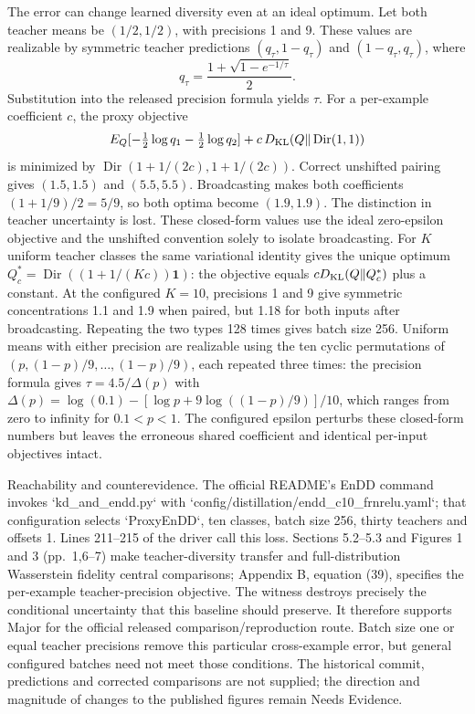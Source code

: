 \documentclass[10pt]{article}
\begin{document}
The error can change learned diversity even at an ideal optimum. Let both teacher means be \((1/2,1/2)\), with precisions 1 and 9. These values are realizable by symmetric teacher predictions \((q_\tau,1-q_\tau)\) and \((1-q_\tau,q_\tau)\), where \[q_\tau=\frac{1+\sqrt{1-e^{-1/\tau}}}{2}.\] Substitution into the released precision formula yields \(\tau\). For a per-example coefficient \(c\), the proxy objective \[E_Q[-\tfrac12\log q_1-\tfrac12\log q_2]
   +c\,D_{\rm KL}(Q\|\operatorname{Dir}(1,1))\] is minimized by \(\operatorname{Dir}(1+1/(2c),1+1/(2c))\). Correct unshifted pairing gives \((1.5,1.5)\) and \((5.5,5.5)\). Broadcasting makes both coefficients \((1+1/9)/2=5/9\), so both optima become \((1.9,1.9)\). The distinction in teacher uncertainty is lost. These closed-form values use the ideal zero-epsilon objective and the unshifted convention solely to isolate broadcasting. For \(K\) uniform teacher classes the same variational identity gives the unique optimum \(Q_c^*=\operatorname{Dir}((1+1/(Kc))\mathbf1)\): the objective equals \(cD_{\rm KL}(Q\Vert Q_c^*)\) plus a constant. At the configured \(K=10\), precisions 1 and 9 give symmetric concentrations 1.1 and 1.9 when paired, but 1.18 for both inputs after broadcasting. Repeating the two types 128 times gives batch size 256. Uniform means with either precision are realizable using the ten cyclic permutations of \((p,(1-p)/9,\ldots,(1-p)/9)\), each repeated three times: the precision formula gives \(\tau=4.5/\Delta(p)\) with \(\Delta(p)=\log(0.1)-[\log p+9\log((1-p)/9)]/10\), which ranges from zero to infinity for \(0.1<p<1\). The configured epsilon perturbs these closed-form numbers but leaves the erroneous shared coefficient and identical per-input objectives intact.\par
Reachability and counterevidence. The official README’s EnDD command invokes `kd\_and\_endd.py` with `config/distillation/endd\_c10\_frnrelu.yaml`; that configuration selects `ProxyEnDD`, ten classes, batch size 256, thirty teachers and offsets 1. Lines 211–215 of the driver call this loss. Sections 5.2–5.3 and Figures 1 and 3 (pp. 1,6–7) make teacher-diversity transfer and full-distribution Wasserstein fidelity central comparisons; Appendix B, equation (39), specifies the per-example teacher-precision objective. The witness destroys precisely the conditional uncertainty that this baseline should preserve. It therefore supports Major for the official released comparison/reproduction route. Batch size one or equal teacher precisions remove this particular cross-example error, but general configured batches need not meet those conditions. The historical commit, predictions and corrected comparisons are not supplied; the direction and magnitude of changes to the published figures remain Needs Evidence.\par
\end{document}
